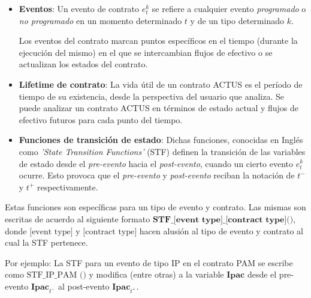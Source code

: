 \documentclass{beamer}
\begin{document}
\begin{frame}
    \begin{itemize}
        \item \textbf{Eventos}: Un evento de contrato $e_t^k$ se refiere a cualquier evento \textit{programado} o \textit{no programado} en un momento determinado $t$ y de un tipo determinado $k$. 

        Los eventos del contrato marcan puntos específicos en el tiempo (durante la ejecución del mismo) en el que se intercambian flujos de efectivo o se actualizan los estados del contrato. 
        \pause
    \pause
        \item \textbf{Lifetime de contrato}: La vida útil de un contrato ACTUS es el período de tiempo de su existencia, desde la perspectiva del usuario que analiza. Se puede analizar un contrato ACTUS en términos de estado actual y flujos de efectivo futuros para cada punto del tiempo. 
    \end{itemize}
\end{frame}

\begin{frame}
    \begin{itemize}
        \item \textbf{Funciones de transición de estado}: Dichas funciones, conocidas en Inglés como \textit{'State Transition Functions'} (STF) definen la transición de las variables de estado desde el \textit{pre-evento} hacia el \textit{post-evento}, cuando un cierto evento $e^k_t$ ocurre. Esto provoca que el  \textit{pre-evento} y \textit{post-evento} reciban la notación de $t^-$ y $t^+$ respectivamente.

  \end{itemize}
  \pause
  \vfill
  Estas funciones son específicas para un tipo de evento y contrato. Las mismas son escritas de acuerdo al siguiente formato $\textbf{STF\_[event type]\_[contract type]()}$, donde $\text{[event type]}$ y $\text{[contract type]}$ hacen alusión al tipo de evento y contrato al cual la STF pertenece.
  \medskip
  \pause

  Por ejemplo: La STF para un evento de tipo IP en el contrato PAM se escribe como $\text{STF\_IP\_PAM ()}$ y modifica (entre otras) a la variable $\textbf{Ipac}$ desde el pre-evento $\textbf{Ipac}_{t^-}$ al post-evento $\textbf{Ipac}_{t^+}$.

\end{frame}
\end{document}
